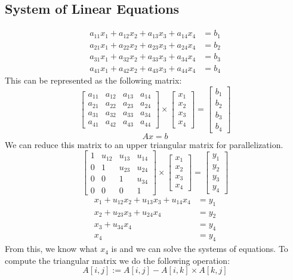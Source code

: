 \documentclass[letterpaper, 12pt]{math}
\begin{document}
\subsection*{System of Linear Equations}
\begin{align*}
  a_{11}x_1+a_{12}x_2+a_{13}x_3+a_{14}x_4 &= b_1 \\
  a_{21}x_1+a_{22}x_2+a_{23}x_3+a_{24}x_4 &= b_2 \\
  a_{31}x_1+a_{32}x_2+a_{33}x_3+a_{34}x_4 &= b_3 \\
  a_{41}x_1+a_{42}x_2+a_{43}x_3+a_{44}x_4 &= b_4
\end{align*}
This can be represented as the following matrix:
\[ \begin{bmatrix}
  a_{11} & a_{12} & a_{13} & a_{14} \\
  a_{21} & a_{22} & a_{23} & a_{24} \\
  a_{31} & a_{32} & a_{33} & a_{34} \\
  a_{41} & a_{42} & a_{43} & a_{44}
\end{bmatrix}\times\begin{bmatrix}
  x_1 \\ x_2 \\ x_3 \\ x_4
\end{bmatrix} = \begin{bmatrix}
  b_1 \\ b_2 \\ b_3 \\ b_4
\end{bmatrix} \]
\[ Ax = b \]
We can reduce this matrix to an upper triangular matrix for parallelization.
\[ \begin{bmatrix}
  1 & u_{12} & u_{13} & u_{14} \\
  0 & 1 & u_{23} & u_{24} \\
  0 & 0 & 1 & u_{34} \\
  0 & 0 & 0 & 1
\end{bmatrix}\times\begin{bmatrix}
  x_1 \\ x_2 \\ x_3 \\ x_4
\end{bmatrix} = \begin{bmatrix}
  y_1 \\ y_2 \\ y_3 \\ y_4
\end{bmatrix} \]
\begin{align*}
  x_1+u_{12}x_2+u_{13}x_3+u_{14}x_4 &= y_1 \\
  x_2+u_{23}x_3+u_{24}x_4 &= y_2 \\
  x_3+u_{34}x_4 &= y_4 \\
  x_4 &= y_4
\end{align*}
From this, we know what \( x_4 \) is and we can solve the systems of equations.
To compute the triangular matrix we do the following operation:
\[ A[i,j] := A[i,j]-A[i,k]\times A[k,j] \]
\end{document}
